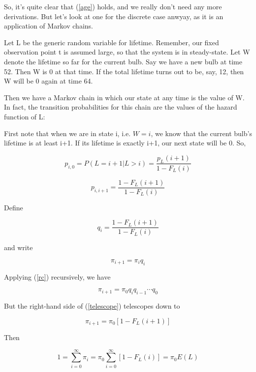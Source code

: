 So, it's quite clear that (\ref{age}) holds, and we really don't need
any more derivations.  But let's look at one for the discrete case
anwyay, as it is an application of Markov chains.

Let L be the generic random variable for lifetime.  Remember, our fixed
observation point t is assumed large, so that the system is in
steady-state.  Let W denote the lifetime so far for the current bulb.
Say we have a new bulb at time 52.  Then W is 0 at that time.  If the
total lifetime turns out to be, say, 12, then W will be 0 again at time
64.  

Then we have a Markov chain in which our state at any time is the value
of W.  In fact, the transition probabilities for this chain are the
values of the hazard function of L:

First note that when we are in state i, i.e. $W = i$, we know that the
current bulb's lifetime is at least i+1.  If its lifetime is exactly
i+1, our next state will be 0.  So,

\begin{equation}
p_{i,0} = P(L = i+1 | L > i) = \frac{p_L(i+1)}{1-F_L(i)}
\end{equation}

\begin{equation}
p_{i,i+1} = \frac{1-F_L(i+1)}{1-F_L(i)}
\end{equation}

Define

\begin{equation}
q_i = \frac{1-F_L(i+1)}{1-F_L(i)}
\end{equation}

and write

\begin{equation}
\label{rc}
\pi_{i+1} = \pi_i q_i
\end{equation}

Applying (\ref{rc}) recursively, we have

\begin{equation}
\label{telescope}
\pi_{i+1} = \pi_0 q_i q_{i-1} \cdots q_0 
\end{equation}

But the right-hand side of (\ref{telescope}) telescopes down to

\begin{equation}
\pi_{i+1} = \pi_0 [1 - F_L(i+1) ]
\end{equation}

Then

\begin{equation}
1 = \sum_{i=0}^{\infty} \pi_i 
= \pi_0 \sum_{i=0}^{\infty} [1 - F_L(i)]  
= \pi_0 E(L)
\end{equation}

